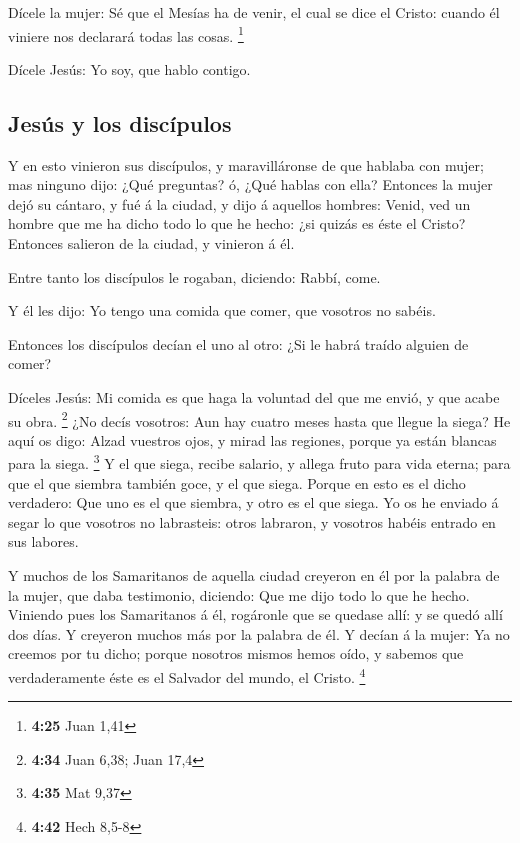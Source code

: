  Dícele la mujer: Sé que el Mesías ha de venir, el cual se
dice el Cristo: cuando él viniere nos declarará todas las cosas.
\footnote{\textbf{4:25} Juan 1,41}

 Dícele Jesús: Yo soy, que hablo contigo.

\hypertarget{jesuxfas-y-los-discuxedpulos}{%
\subsection{Jesús y los discípulos}\label{jesuxfas-y-los-discuxedpulos}}

 Y en esto vinieron sus discípulos, y maravilláronse de que
hablaba con mujer; mas ninguno dijo: ¿Qué preguntas? ó, ¿Qué hablas con
ella?  Entonces la mujer dejó su cántaro, y fué á la
ciudad, y dijo á aquellos hombres:  Venid, ved un hombre
que me ha dicho todo lo que he hecho: ¿si quizás es éste el Cristo?
 Entonces salieron de la ciudad, y vinieron á él.

 Entre tanto los discípulos le rogaban, diciendo: Rabbí,
come.

 Y él les dijo: Yo tengo una comida que comer, que vosotros
no sabéis.

 Entonces los discípulos decían el uno al otro: ¿Si le
habrá traído alguien de comer?

 Díceles Jesús: Mi comida es que haga la voluntad del que
me envió, y que acabe su obra. \footnote{\textbf{4:34} Juan 6,38; Juan
  17,4}  ¿No decís vosotros: Aun hay cuatro meses hasta que
llegue la siega? He aquí os digo: Alzad vuestros ojos, y mirad las
regiones, porque ya están blancas para la siega. \footnote{\textbf{4:35}
  Mat 9,37}  Y el que siega, recibe salario, y allega fruto
para vida eterna; para que el que siembra también goce, y el que siega.
 Porque en esto es el dicho verdadero: Que uno es el que
siembra, y otro es el que siega.  Yo os he enviado á segar
lo que vosotros no labrasteis: otros labraron, y vosotros habéis entrado
en sus labores.

 Y muchos de los Samaritanos de aquella ciudad creyeron en
él por la palabra de la mujer, que daba testimonio, diciendo: Que me
dijo todo lo que he hecho.  Viniendo pues los Samaritanos á
él, rogáronle que se quedase allí: y se quedó allí dos días.
 Y creyeron muchos más por la palabra de él. 
Y decían á la mujer: Ya no creemos por tu dicho; porque nosotros mismos
hemos oído, y sabemos que verdaderamente éste es el Salvador del mundo,
el Cristo. \footnote{\textbf{4:42} Hech 8,5-8}

